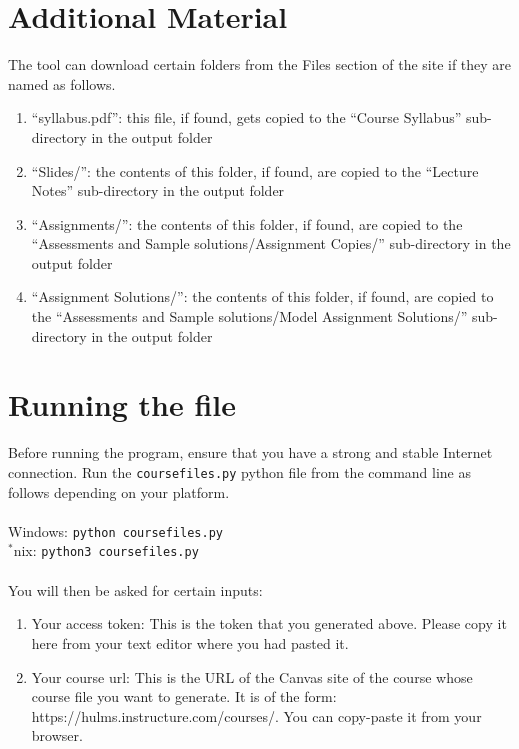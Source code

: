 \documentclass{article}
\begin{document}
\section{Additional Material}

The tool can download certain folders from the Files section of the site
if they are named as follows.

\begin{enumerate}
\def\labelenumi{\arabic{enumi}.}
\item
  ``syllabus.pdf'': this file, if found, gets copied to the ``Course
  Syllabus'' sub-directory in the output folder
\item
  ``Slides/'': the contents of this folder, if found, are copied to the
  ``Lecture Notes'' sub-directory in the output folder
\item
  ``Assignments/'': the contents of this folder, if found, are copied to
  the ``Assessments and Sample solutions/Assignment Copies/''
  sub-directory in the output folder
\item
  ``Assignment Solutions/'': the contents of this folder, if found, are
  copied to the ``Assessments and Sample solutions/Model Assignment
  Solutions/'' sub-directory in the output folder
\end{enumerate}

\section{Running the file}

Before running the program, ensure that you have a strong and stable
Internet connection. Run the \texttt{coursefiles.py} python file from
the command line as follows depending on your platform.
\\\\Windows: \texttt{python\ coursefiles.py}\\
$^*$nix: \texttt{python3\ coursefiles.py}\\\\
You will then be asked for certain inputs: 

\begin{enumerate}
\def\labelenumi{\arabic{enumi}.}
\item Your access token: This is
the token that you generated above. Please copy it here from your text
editor where you had pasted it. 
\item Your course url: This is the URL of
the Canvas site of the course whose course file you want to generate. It is of the form: https://hulms.instructure.com/courses/. You can
copy-paste it from your browser.
\end{enumerate}
\end{document}
